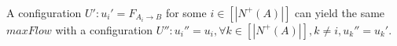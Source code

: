 \begin{theorem} \ \\
   \label{trustsave}
   A configuration $U' : u_i' = F_{A_i \rightarrow B}$ for some $i \in [|N^{+}(A)|]$ can yield the same $maxFlow$ with a
   configuration $U'' : u_i'' = u_i, \forall k \in [|N^{+}(A)|], k \neq i, u_k'' = u_k'$.
\end{theorem}
